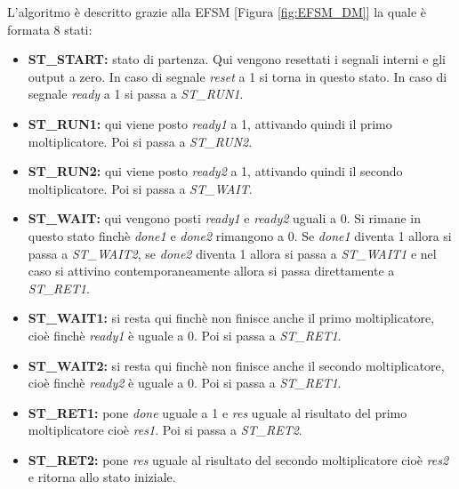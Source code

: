 \documentclass[]{IEEEtran}
\begin{document}
L'algoritmo è descritto grazie alla EFSM [Figura \ref{fig:EFSM_DM}] la quale è formata 8 stati:
\begin{itemize}
    \item \textbf{ST\_START:} stato di partenza. Qui vengono resettati i segnali interni e gli output a zero. In caso di segnale \textit{reset} a 1 si torna in questo stato. In caso di segnale \textit{ready} a 1 si passa a \textit{ST\_RUN1}.
    \item \textbf{ST\_RUN1:} qui viene posto \textit{ready1} a 1, attivando quindi il primo moltiplicatore. Poi si passa a \textit{ST\_RUN2}.
    \item \textbf{ST\_RUN2:} qui viene posto \textit{ready2} a 1, attivando quindi il secondo moltiplicatore. Poi si passa a \textit{ST\_WAIT}.
    \item \textbf{ST\_WAIT:} qui vengono posti \textit{ready1} e \textit{ready2} uguali a 0. Si rimane in questo stato finchè \textit{done1} e \textit{done2} rimangono a 0. Se \textit{done1} diventa 1 allora si passa a \textit{ST\_WAIT2}, se \textit{done2} diventa 1 allora si passa a \textit{ST\_WAIT1} e nel caso si attivino contemporaneamente allora si passa direttamente a \textit{ST\_RET1}.
    \item \textbf{ST\_WAIT1:} si resta qui finchè non finisce anche il primo moltiplicatore, cioè finchè \textit{ready1} è uguale a 0. Poi si passa a \textit{ST\_RET1}.
    \item \textbf{ST\_WAIT2:} si resta qui finchè non finisce anche il secondo moltiplicatore, cioè finchè \textit{ready2} è uguale a 0. Poi si passa a \textit{ST\_RET1}.
    \item \textbf{ST\_RET1:} pone \textit{done} uguale a 1 e \textit{res} uguale al risultato del primo moltiplicatore cioè \textit{res1}. Poi si passa a \textit{ST\_RET2}.
    \item \textbf{ST\_RET2:} pone \textit{res} uguale al risultato del secondo moltiplicatore cioè \textit{res2} e ritorna allo stato iniziale.
\end{itemize}
\end{document}
